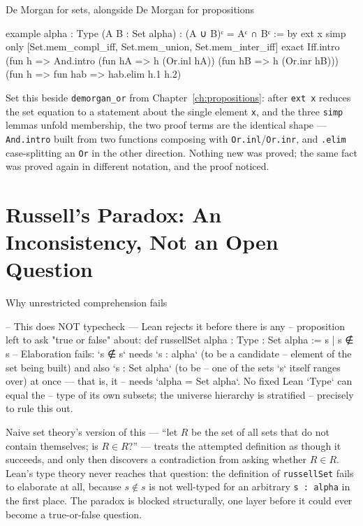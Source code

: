 \begin{experiment}{De Morgan for sets, alongside De Morgan for propositions}
\begin{lean}
example {alpha : Type} (A B : Set alpha) :
    (A ∪ B)ᶜ = Aᶜ ∩ Bᶜ := by
  ext x
  simp only [Set.mem_compl_iff, Set.mem_union, Set.mem_inter_iff]
  exact Iff.intro
    (fun h => And.intro (fun hA => h (Or.inl hA)) (fun hB => h (Or.inr hB)))
    (fun h => fun hab => hab.elim h.1 h.2)
\end{lean}
Set this beside \texttt{demorgan\_or} from
Chapter~\ref{ch:propositions}: after \texttt{ext x} reduces the
set equation to a statement about the single element \texttt{x}, and
the three \texttt{simp} lemmas unfold membership, the two proof terms
are the identical shape — \texttt{And.intro} built from two
functions composing with \texttt{Or.inl}/\texttt{Or.inr}, and
\texttt{.elim} case-splitting an \texttt{Or} in the other direction.
Nothing new was proved; the same fact was proved again in
different notation, and the proof noticed.
\end{experiment}

\section{Russell's Paradox: An Inconsistency, Not an Open Question}

\begin{experiment}{Why unrestricted comprehension fails}
\begin{lean}
-- This does NOT typecheck — Lean rejects it before there is any
-- proposition left to ask "true or false" about:
def russellSet {alpha : Type} : Set alpha := {s | s ∉ s}
-- Elaboration fails: `s ∉ s` needs `s : alpha` (to be a candidate
-- element of the set being built) and also `s : Set alpha` (to be
-- one of the sets `s` itself ranges over) at once — that is, it
-- needs `alpha = Set alpha`. No fixed Lean `Type` can equal the
-- type of its own subsets; the universe hierarchy is stratified
-- precisely to rule this out.
\end{lean}
Naive set theory's version of this — ``let $R$ be the set of all
sets that do not contain themselves; is $R \in R$?'' — treats the
attempted definition as though it succeeds, and only then discovers
a contradiction from asking whether $R \in R$. Lean's type theory
never reaches that question: the definition of \texttt{russellSet}
fails to elaborate at all, because $s \notin s$ is not
well-typed for an arbitrary \texttt{s : alpha} in the first place.
The paradox is blocked structurally, one layer before it could ever
become a true-or-false question.
\end{experiment}

